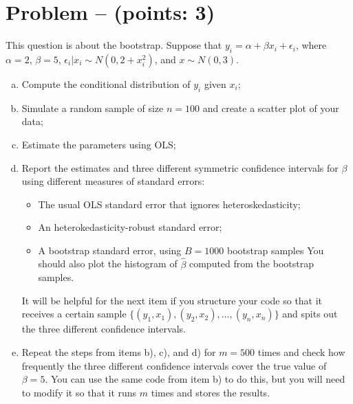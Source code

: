 \documentclass[11pt]{article}
\theoremstyle{definition}
\newcounter{problem}
\renewcommand{\theproblem}{\arabic{problem}}
\newcommand{\problem}[1]{
	\stepcounter{problem}
	\section*{Problem \theproblem{} -- (points: #1)}
}
\begin{document}
\problem{3}
This question is about the bootstrap. Suppose that $y_i = \alpha + \beta x_i + \epsilon_i$, where $\alpha = 2$, $\beta = 5$, $\epsilon_i|x_i \sim N(0, 2 + x_i^2)$, and $x \sim N(0, 3)$.
\begin{enumerate}[a)]
	\item Compute the conditional distribution of $y_i$ given $x_i$;
	\item Simulate a random sample of size $n = 100$ and create a scatter plot of your data;
	\item Estimate the parameters using OLS;
	\item Report the estimates and three different symmetric confidence intervals for $\beta$ using different measures of standard errors:
	\begin{itemize}
		\item The usual OLS standard error that ignores heteroskedasticity;
		\item An heterokedasticity-robust standard error;
		\item A bootstrap standard error, using $B = 1000$ bootstrap samples
	You should also plot the histogram of $\hat{\beta}$ computed from the bootstrap samples.
	\end{itemize}

	It will be helpful for the next item if you structure your code so that it receives a certain sample $\{(y_1, x_1), (y_2, x_2), ..., (y_n, x_n)\}$ and spits out the three different confidence intervals.

	\item Repeat the steps from items b), c), and d) for $m = 500$ times and check how frequently the three different confidence intervals cover the true value of $\beta = 5$. You can use the same code from item b) to do this, but you will need to modify it so that it runs $m$ times and stores the results.
\end{enumerate}
\end{document}
